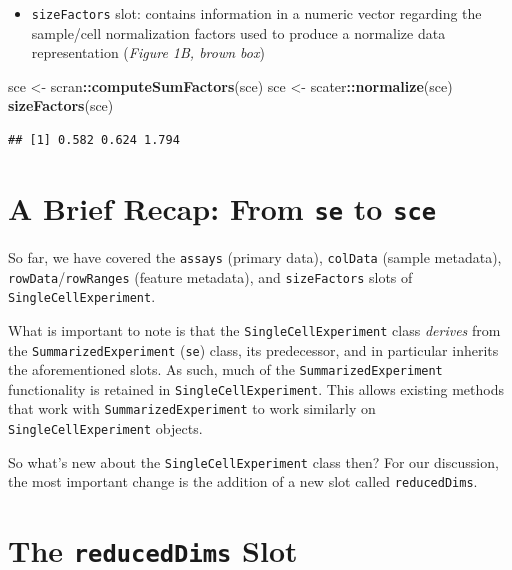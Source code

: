 \documentclass[]{book}
\newenvironment{Shaded}{\begin{snugshade}}{\end{snugshade}}
\newcommand{\KeywordTok}[1]{\textcolor[rgb]{0.13,0.29,0.53}{\textbf{#1}}}
\newcommand{\NormalTok}[1]{#1}
\newcommand{\OperatorTok}[1]{\textcolor[rgb]{0.81,0.36,0.00}{\textbf{#1}}}
\newcommand{\StringTok}[1]{\textcolor[rgb]{0.31,0.60,0.02}{#1}}
\providecommand{\tightlist}{%
  \setlength{\itemsep}{0pt}\setlength{\parskip}{0pt}}
\begin{document}
\begin{itemize}
\tightlist
\item
  \texttt{sizeFactors} slot: contains information in a numeric vector regarding the sample/cell normalization factors used to produce a normalize data representation (\emph{Figure 1B, brown box})
\end{itemize}

\begin{Shaded}
\begin{Highlighting}[]
\NormalTok{sce <-}\StringTok{ }\NormalTok{scran}\OperatorTok{::}\KeywordTok{computeSumFactors}\NormalTok{(sce)}
\NormalTok{sce <-}\StringTok{ }\NormalTok{scater}\OperatorTok{::}\KeywordTok{normalize}\NormalTok{(sce)}
\KeywordTok{sizeFactors}\NormalTok{(sce)}
\end{Highlighting}
\end{Shaded}

\begin{verbatim}
## [1] 0.582 0.624 1.794
\end{verbatim}

\hypertarget{a-brief-recap-from-se-to-sce}{%
\section{\texorpdfstring{A Brief Recap: From \texttt{se} to \texttt{sce}}{A Brief Recap: From se to sce}}\label{a-brief-recap-from-se-to-sce}}

So far, we have covered the \texttt{assays} (primary data), \texttt{colData} (sample metadata), \texttt{rowData}/\texttt{rowRanges} (feature metadata), and \texttt{sizeFactors} slots of \texttt{SingleCellExperiment}.

What is important to note is that the \texttt{SingleCellExperiment} class \emph{derives} from the \texttt{SummarizedExperiment} (\texttt{se}) class, its predecessor, and in particular inherits the aforementioned slots. As such, much of the \texttt{SummarizedExperiment} functionality is retained in \texttt{SingleCellExperiment}. This allows existing methods that work with \texttt{SummarizedExperiment} to work similarly on \texttt{SingleCellExperiment} objects.

So what's new about the \texttt{SingleCellExperiment} class then? For our discussion, the most important change is the addition of a new slot called \texttt{reducedDims}.

\hypertarget{the-reduceddims-slot}{%
\section{\texorpdfstring{The \texttt{reducedDims} Slot}{The reducedDims Slot}}\label{the-reduceddims-slot}}
\end{document}
